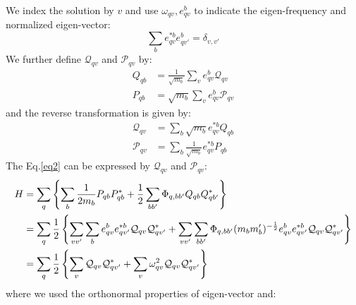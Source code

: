 \documentclass{article}
\begin{document}
We index the solution by $v$ and use $\omega_{qv}, e_{qv}^b$ to indicate the eigen-frequency and normalized eigen-vector:
\begin{equation}
    \sum_b e_{qv}^{*b} e_{qv'}^b = \delta_{v,v'}
\end{equation}
We further define $\mathcal{Q}_{qv}$ and $\mathcal{P}_{qv}$ by:
\begin{align}
    Q_{qb} &= \frac{1}{\sqrt{m_b}} \sum_v e_{qv}^b \mathcal{Q}_{qv} \\
    P_{qb} &= \sqrt{m_b} \sum_v e_{qv}^b \mathcal{P}_{qv}
\end{align}
and the reverse transformation is given by:
\begin{align}
    \mathcal{Q}_{qv} &= \sum_b \sqrt{m_b} e_{qv}^{*b} Q_{qb} \\
    \mathcal{P}_{qv} &= \sum_b \frac{1}{\sqrt{m_b}} e_{qv}^{*b} P_{qb}
\end{align}
The Eq.\ref{eq2} can be expressed by $\mathcal{Q}_{qv}$ and $\mathcal{P}_{qv}$:
\begin{align}
    H &= \sum_{q} \left\{ \sum_{b} \frac{1}{2m_b} P_{qb} P_{qb}^* + \frac{1}{2} \sum_{bb'} \Phi_{q,bb'} Q_{qb} Q_{qb'}^* \right\} \notag \\
      &= \sum_{q} \frac{1}{2} 
      \left\{ \sum_{vv'} \sum_{b}e_{qv}^b e_{qv'}^{*b} \mathcal{Q}_{qv} \mathcal{Q}^*_{qv'} + \sum_{vv'} \sum_{bb'} \Phi_{q,bb'} (m_b m_b')^{-\frac{1}{2}} e_{qv}^b e_{qv'}^{*b} \mathcal{Q}_{qv} \mathcal{Q}^*_{qv'}\right\} \notag \\
      &= \sum_{q} \frac{1}{2} 
      \left\{ \sum_{v} \mathcal{Q}_{qv} \mathcal{Q}^*_{qv'} + \sum_{v} \omega^2_{qv} \mathcal{Q}_{qv} \mathcal{Q}^*_{qv'}\right\} \notag \\
\end{align}
where we used the orthonormal properties of eigen-vector and:
\end{document}
